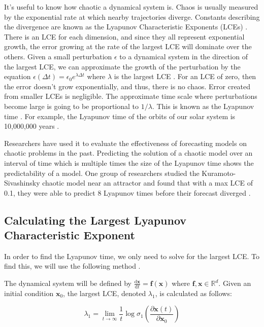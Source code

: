 \documentclass{article}
\newcommand{\der}[2][t]{\frac{\mathrm{d}#2}{\mathrm{d}#1}}
\begin{document}
It's useful to know how chaotic a dynamical system
is. Chaos is usually measured by the exponential rate at which nearby
trajectories diverge. Constants describing the divergence are known as the
Lyapunov Characteristic Exponents (LCEs) \cite{sandri1996numerical}.
There is
an LCE for each dimension, and since they all represent exponential growth,
the error growing at the rate of the largest LCE will dominate over the 
others.
Given a small perturbation $\epsilon$ to a dynamical system in the direction
of the largest LCE, we can approximate the growth of the perturbation by the
equation $\epsilon(\Delta t) = \epsilon_0 e^{\lambda \Delta t}$ where
$\lambda$ is the largest LCE \cite{bezruchko2010extracting}. For an LCE of
zero, then the error doesn't grow exponentially, and thus, there is no chaos.
Error created from smaller LCEs is negligible. The approximate time scale
where perturbations become large is going to be proportional to $1 /
\lambda$. This is known as the Lyapunov time \cite{bezruchko2010extracting}.
For example, the Lyapunov time of the orbits of our solar system is
10,000,000 years
\cite{oestreicher2007history}.

Researchers have used it to evaluate the
effectiveness of forecasting models on chaotic problems in the past.
Predicting the solution of a chaotic model over an
interval of time which is multiple times the size of the Lyapunov time shows
the predictability of a model. One group of researchers studied the 
Kuramoto-Sivashinsky chaotic model near an attractor and found that with a max
LCE of 0.1, they were able to predict 8 Lyapunov times before their forecast 
diverged \cite{pathak2018model}.

\subsection{Calculating the Largest Lyapunov Characteristic Exponent}
\label{sec:calc_lya}

In order to find the Lyapunov time, we only need to solve for the largest
LCE. To find this, we will use the following method
\cite{viswanath1998lyapunov}.

\newcommand{\xv}{\mathbf{x}}
\newcommand{\fv}{\mathbf{f}}
\newcommand{\Mv}{\mathbf{M}}

The dynamical system will be defined by $\der{\xv}=\fv(\xv)$ where $\fv, \xv
\in \mathbb{R}^d$. Given an initial condition $\xv_0$, the largest LCE,
denoted $\lambda_1$, is calculated as follows:

\begin{equation}
    \lambda_1 = \lim_{t \to \infty} \frac{1}{t}\log \sigma_1(\frac{\partial \xv(t)}{\partial \xv_0}) \label{eq:max_lce}
\end{equation}
\end{document}
